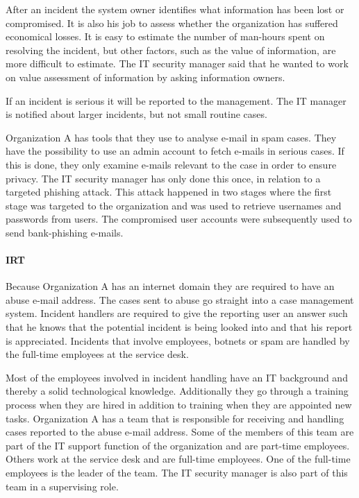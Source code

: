 After an incident the system owner identifies what information has been lost or compromised. It is also his job to assess whether the organization has suffered economical losses. It is easy to estimate the number of man-hours spent on resolving the incident, but other factors, such as the value of information, are more difficult to estimate. The IT security manager said that he wanted to work on value assessment of information by asking information owners.

If an incident is serious it will be reported to the management. The IT manager is notified about larger incidents, but not small routine cases.

Organization A has tools that they use to analyse e-mail in spam cases. They have the possibility to use an admin account to fetch e-mails in serious cases. If this is done, they only examine e-mails relevant to the case in order to ensure privacy. The IT security manager has only done this once, in relation to a targeted phishing attack. This attack happened in two stages where the first stage was targeted to the organization and was used to retrieve usernames and passwords from users. The compromised user accounts were subsequently used to send bank-phishing e-mails.

\paragraph{\acl{IRT}}
Because Organization A has an internet domain they are required to have an abuse e-mail address. The cases sent to abuse go straight into a case management system. Incident handlers are required to give the reporting user an answer such that he knows that the potential incident is being looked into and that his report is appreciated. Incidents that involve employees, botnets or spam are handled by the full-time employees at the service desk. 

Most of the employees involved in incident handling have an IT background and thereby a solid technological knowledge. Additionally they go through a training process when they are hired in addition to training when they are appointed new tasks. Organization A has a team that is responsible for receiving and handling cases reported to the abuse e-mail address. Some of the members of this team are part of the IT support function of the organization and are part-time employees. Others work at the service desk and are full-time employees. One of the full-time employees is the leader of the team. The IT security manager is also part of this team in a supervising role. 

